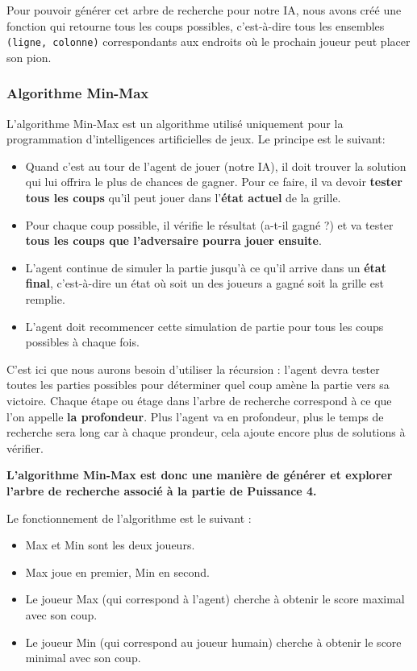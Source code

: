 \documentclass[11pt]{article}
\begin{document}
Pour pouvoir générer cet arbre de recherche pour notre IA, nous avons créé une fonction qui retourne tous les coups possibles, c'est-à-dire tous les ensembles \texttt{(ligne, colonne)} correspondants aux endroits où le prochain joueur peut placer son pion.

\subsubsection*{Algorithme Min-Max}
\label{sec:orgb22c829}
L'algorithme Min-Max est un algorithme utilisé uniquement pour la programmation d'intelligences artificielles de jeux. Le principe est le suivant:
\begin{itemize}
\item Quand c'est au tour de l'agent de jouer (notre IA), il doit trouver la solution qui lui offrira le plus de chances de gagner. Pour ce faire, il va devoir \textbf{tester tous les coups} qu'il peut jouer dans l'\textbf{état actuel} de la grille.
\item Pour chaque coup possible, il vérifie le résultat (a-t-il gagné ?) et va tester \textbf{tous les coups que l'adversaire pourra jouer ensuite}.
\item L'agent continue de \og simuler\fg{} la partie jusqu'à ce qu'il arrive dans un \textbf{état final}, c'est-à-dire un état où soit un des joueurs a gagné soit la grille est remplie.
\item L'agent doit recommencer cette simulation de partie pour tous les coups possibles à chaque fois.
\end{itemize}

C'est ici que nous aurons besoin d'utiliser la récursion : l'agent devra tester toutes les parties possibles pour déterminer quel coup amène la partie vers sa victoire. Chaque \og étape\fg{} ou \og étage\fg{} dans l'arbre de recherche correspond à ce que l'on appelle \textbf{la profondeur}. Plus l'agent va en profondeur, plus le temps de recherche sera long car à chaque prondeur, cela ajoute encore plus de solutions à vérifier.

\textbf{L'algorithme Min-Max est donc une manière de générer et explorer l'arbre de recherche associé à la partie de Puissance 4.}

Le fonctionnement de l'algorithme est le suivant :
\begin{itemize}
\item Max et Min sont les deux joueurs.
\item Max joue en premier, Min en second.
\item Le joueur Max (qui correspond à l'agent) cherche à obtenir le score maximal avec son coup.
\item Le joueur Min (qui correspond au joueur humain) cherche à obtenir le score minimal avec son coup.
\end{itemize}
\end{document}
